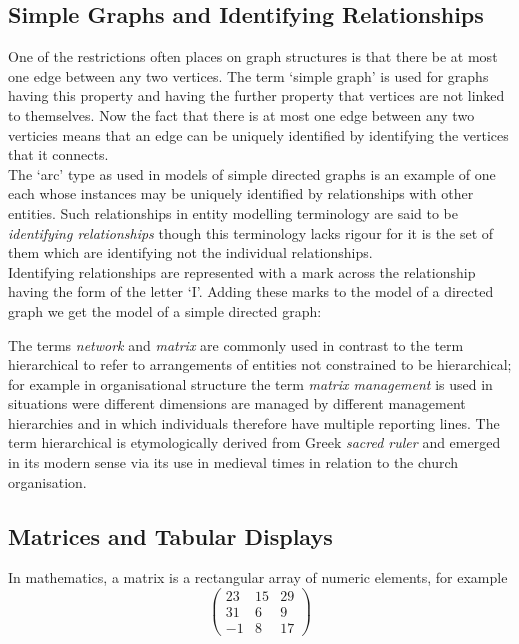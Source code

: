 
\subsection {Simple Graphs and Identifying Relationships}
\noindent One of the restrictions often places on graph structures is that there be at most one edge between any two vertices. The term `simple graph' is used for graphs having this property and having the further property that vertices are not linked to themselves. Now the fact that there is at most one edge between any two verticies means that an edge can be uniquely identified by identifying the vertices that it connects. \\

\noindent The `arc' type as used in models of simple directed graphs is an example of one each whose instances may be uniquely identified by relationships with other entities. Such relationships in entity modelling terminology are said to be \textit{identifying relationships} though this terminology lacks rigour for it is the set of them which are identifying not the individual relationships. \\    

\noindent Identifying relationships are represented with a mark across the relationship having the form of the letter `I'. Adding these marks to the model of a directed graph we get the model of a simple directed graph: 



\noindent The terms \textit{network} and \textit {matrix} are commonly used in contrast to the term hierarchical to refer to arrangements of entities not constrained to be hierarchical; for example in organisational structure the term \textit{matrix management} is used in
situations were different dimensions are managed by different management hierarchies and in which individuals therefore have multiple reporting lines. The term hierarchical is etymologically derived from Greek \textit{sacred ruler} and emerged in its modern sense via its use in medieval times in relation to the church organisation. \\

\subsection{Matrices and Tabular Displays}

\noindent In mathematics, a matrix is a rectangular array of numeric elements, for example
\[ \left( \begin{array}{ccc}
23 & 15 & 29 \\
31 & 6 & 9 \\
-1 & 8 & 17 \end{array} \right)\] 

